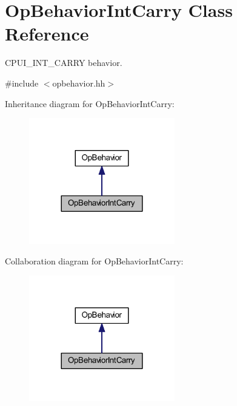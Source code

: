 \hypertarget{class_op_behavior_int_carry}{}\section{Op\+Behavior\+Int\+Carry Class Reference}
\label{class_op_behavior_int_carry}


C\+P\+U\+I\+\_\+\+I\+N\+T\+\_\+\+C\+A\+R\+RY behavior.  




{\ttfamily \#include $<$opbehavior.\+hh$>$}



Inheritance diagram for Op\+Behavior\+Int\+Carry\+:
\nopagebreak
\begin{figure}[H]
\begin{center}
\leavevmode
\includegraphics[width=180pt]{class_op_behavior_int_carry__inherit__graph}
\end{center}
\end{figure}


Collaboration diagram for Op\+Behavior\+Int\+Carry\+:
\nopagebreak
\begin{figure}[H]
\begin{center}
\leavevmode
\includegraphics[width=180pt]{class_op_behavior_int_carry__coll__graph}
\end{center}
\end{figure}

